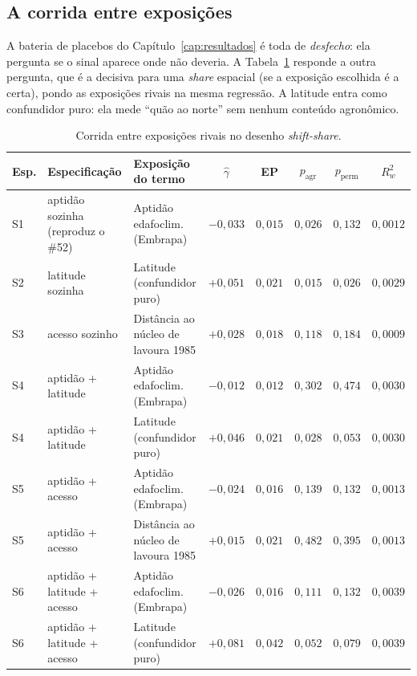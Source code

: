 \subsection{A corrida entre exposições}

A bateria de placebos do Capítulo~\ref{cap:resultados} é toda de \emph{desfecho}:
ela pergunta se o sinal aparece onde não deveria. A
Tabela~\ref{tab:horserace} responde a outra pergunta, que é a decisiva para uma
\emph{share} espacial (se a exposição escolhida é a certa), pondo as
exposições rivais na mesma regressão. A latitude entra como confundidor puro:
ela mede ``quão ao norte'' sem nenhum conteúdo agronômico.


\begin{table}[!ht]
\centering
\caption[Corrida entre exposições rivais]{Corrida entre exposições rivais no desenho \emph{shift-share}.}
\label{tab:horserace}
\footnotesize
\begin{tabular}{lp{3.5cm}p{3.1cm}ccccc}
\toprule
\textbf{Esp.} & \textbf{Especificação} & \textbf{Exposição do termo} & \textbf{$\hat{\gamma}$} & \textbf{EP} & \textbf{$p_{\mathrm{agr}}$} & \textbf{$p_{\mathrm{perm}}$} & \textbf{$R^2_w$} \\
\midrule
S1 & aptidão sozinha (reproduz o \#52) & Aptidão edafoclim. (Embrapa) & $-0{,}033$ & $0{,}015$ & $0{,}026$ & $0{,}132$ & $0{,}0012$ \\
S2 & latitude sozinha & Latitude (confundidor puro) & $+0{,}051$ & $0{,}021$ & $0{,}015$ & $0{,}026$ & $0{,}0029$ \\
S3 & acesso sozinho & Distância ao núcleo de lavoura 1985 & $+0{,}028$ & $0{,}018$ & $0{,}118$ & $0{,}184$ & $0{,}0009$ \\
S4 & aptidão + latitude & Aptidão edafoclim. (Embrapa) & $-0{,}012$ & $0{,}012$ & $0{,}302$ & $0{,}474$ & $0{,}0030$ \\
S4 & aptidão + latitude & Latitude (confundidor puro) & $+0{,}046$ & $0{,}021$ & $0{,}028$ & $0{,}053$ & $0{,}0030$ \\
S5 & aptidão + acesso & Aptidão edafoclim. (Embrapa) & $-0{,}024$ & $0{,}016$ & $0{,}139$ & $0{,}132$ & $0{,}0013$ \\
S5 & aptidão + acesso & Distância ao núcleo de lavoura 1985 & $+0{,}015$ & $0{,}021$ & $0{,}482$ & $0{,}395$ & $0{,}0013$ \\
S6 & aptidão + latitude + acesso & Aptidão edafoclim. (Embrapa) & $-0{,}026$ & $0{,}016$ & $0{,}111$ & $0{,}132$ & $0{,}0039$ \\
S6 & aptidão + latitude + acesso & Latitude (confundidor puro) & $+0{,}081$ & $0{,}042$ & $0{,}052$ & $0{,}079$ & $0{,}0039$ \\

\end{tabular}
\end{table}
